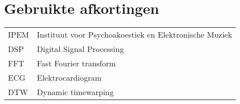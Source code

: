 \chapter{Gebruikte afkortingen}
\begin{flushleft}
	\renewcommand{\baselinestretch}{1.5}
	\small\normalsize
	\begin{longtable}{ll}
		IPEM				&  Instituut voor Psychoakoestiek en Elektronische Muziek \\
		DSP					&  Digital Signal Processing \\
		FFT					&  Fast Fourier transform \\
		ECG					&  Elektrocardiogram \\
		DTW					&  Dynamic timewarping
	\end{longtable}
\end{flushleft}